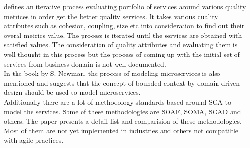 \cite{Ma:2009aa} defines an iterative process evaluating portfolio of services around various quality metrices in order get the better quality services. It takes various quality attributes such as cohesion, coupling, size etc into consideration to find out their overal metrics value. The process is iterated until the services are obtained with satisfied values. The consideration of quality attributes and evaluating them is well thought in this process but the process of coming up with the initial set of services from business domain is not well documented.\\
In the book by S. Newman, the process of modeling microservices is also mentioned and suggests that the concept of bounded context by domain driven design should be used to model microservices.\cite{Newman:2015aa}\\
Additionally there are a lot of methodology standards based around \acrshort{SOA} to model the services. Some of these methodologies are \acrshort{SOAF}, \acrshort{SOMA}, \acrshort{SOAD} and others. The paper \cite{Ramollari:2016aa} presents a detail list and comparision of these methodologies. Most of them are not yet implemented in industries and others not compatible with agile practices.